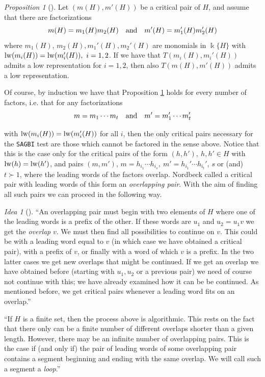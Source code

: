 \documentclass{amsart}
\theoremstyle{definition}
\theoremstyle{remark}
\newtheorem{proposition}[theorem]{Proposition}
\newtheorem{idea}{Idea}[section]
\numberwithin{equation}{section}
\begin{document}
\begin{proposition}[{\cite[Proposition 6]{Nordbeck1998}}]\label{Nordbeck1998Proposition6}
Let $(m(H), m'(H))$ be a critical pair of $H$, and assume that there are factorizations $$
m(H) = m_1(H) m_2(H)\quad {\rm and} \quad m'(H) = m_1'(H) m_2'(H)$$ where $m_1(H)$, $m_2(H), m_1'(H), m_2'(H)$ are monomials in $\Bbbk \{H\}$ with ${\rm lw}(m_i(H)) = {\rm lw}(m_i'(H)),\ i = 1, 2$. If we have that $T(m_i(H), m_i'(H))$ admits a low representation for $i = 1, 2$, then also $T(m(H), m'(H))$ admits a low representation.
\end{proposition}

Of course, by induction we have that Proposition \ref{Nordbeck1998Proposition6} holds for every number of factors, i.e. that for any factorizations 
$$
m = m_1 \dotsb m_t \quad {\rm and} \quad m' = m_1' \dotsb m_t'
$$ 

with ${\rm lw}(m_i(H)) = {\rm lw} (m_i'(H))$ for all $i$, then the only critical pairs necessary for the \texttt{SAGBI} test are those which cannot be factored in the sense above. Notice that this is the case only for the critical pairs of the form $(h, h'),\ h, h'\in H$ with ${\rm lw}(h) = {\rm lw} (h')$, and pairs $(m, m')$, $m = h_{i_1}\dotsb h_{i_s},\ m' = h_{i_1}' \dotsb h_{i_t}'$, $s$ or (and) $t \succ 1$, where the leading words of the factors overlap. Nordbeck called a critical pair with leading words of this form an {\em overlapping pair}. With the aim of finding all such pairs we can proceed in the following way.

\begin{idea}[{\cite[p. 143]{Nordbeck1998}}]
\textquotedblleft An overlapping pair must begin with two elements of $H$ where one of the leading words is a prefix of the other. If these words are $u_1$ and $u_2 = u_1v$ we get the {\em overlap} $v$. We must then find all possibilities to continue on $v$. This could be with a leading word equal to $v$ (in which case we have obtained a critical pair), with a prefix of $v$, or finally with a word of which $v$ is a prefix. In the two latter cases we get new overlaps that might be continued. If we get an overlap we have obtained before (starting with $u_1, u_2$ or a previous pair) we need of course not continue with this; we have already examined how it can be be continued. As mentioned before, we get critical pairs whenever a leading word fits on an overlap.\textquotedblright

\textquotedblleft If $H$ is a finite set, then the process above is algorithmic. This rests on the fact that there only can be a finite number of different overlaps shorter than a given length. However, there may be an infinite number of overlapping pairs. This is the case if (and only if) the pair of leading words of some overlapping pair contains a segment beginning and ending with the same overlap. We will call such a segment a {\em loop}.\textquotedblright
\end{idea}
\end{document}
